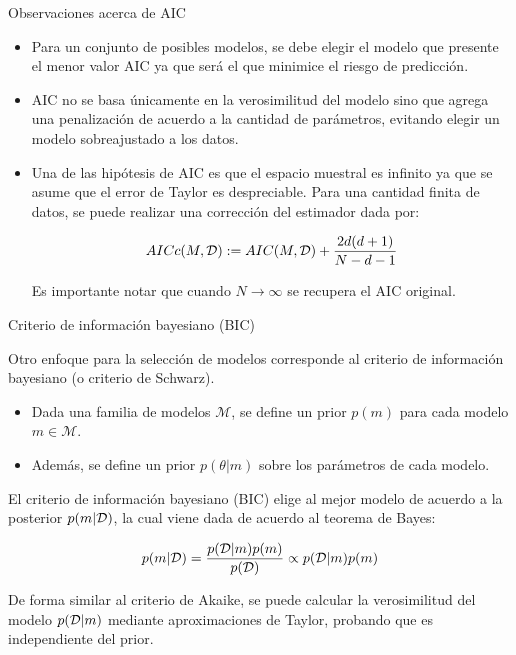 \documentclass[9pt]{beamer}
\begin{document}
\begin{frame}{Observaciones acerca de AIC}
\begin{itemize}
	\item Para un conjunto de posibles modelos, se debe elegir el modelo que presente el menor valor AIC ya que será el que minimice el riesgo de predicción.\pause
	\item AIC no se basa únicamente en la verosimilitud del modelo sino que agrega una penalización de acuerdo a la cantidad de parámetros, evitando elegir un modelo sobreajustado a los datos.\pause
	\item  Una de las hipótesis de AIC es que el espacio muestral es infinito ya que se asume que el error de Taylor es despreciable. Para una cantidad finita de datos, se puede realizar una corrección del estimador dada por:
	
	\begin{equation*}
		AICc(M,{\mathcal D}) := AIC(M,{\mathcal D}) + \frac{2d(d+1)}{N-d-1}
	\end{equation*}
	
	Es importante notar que cuando $N\to\infty$ se recupera el AIC original.
\end{itemize}
	
\end{frame}

\begin{frame}{Criterio de información bayesiano (BIC)}

Otro enfoque para la selección de modelos corresponde al criterio de información bayesiano (o criterio de Schwarz).\pause

\begin{itemize}
	\item Dada una familia de modelos $\mathcal{M}$, se define un prior $p(m)$ para cada modelo $m\in\mathcal{M}$.\pause
	\item Además, se define un prior $p(\theta|m)$ sobre los parámetros de cada modelo.\pause
\end{itemize}

   El criterio de información bayesiano (BIC) elige al mejor modelo de acuerdo a la posterior $p(m|{\mathcal D})$, la cual viene dada de acuerdo al teorema de Bayes:

\begin{equation*}
	p(m|{\mathcal D})=\frac{p({\mathcal D}|m)p(m)}{p({\mathcal D})}\propto p({\mathcal D}|m)p(m)
\end{equation*}\pause

De forma similar al criterio de Akaike, se puede calcular la verosimilitud del modelo $p({\mathcal D}|m)$ mediante aproximaciones de Taylor, probando que es independiente del prior. 
	
\end{frame}
\end{document}
